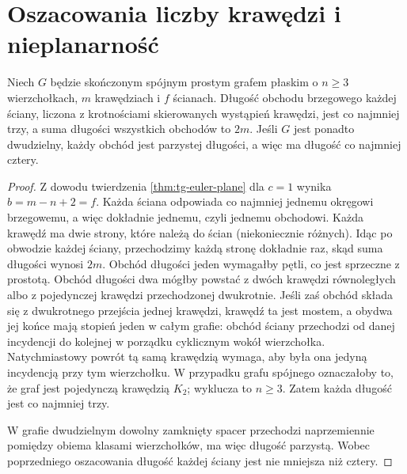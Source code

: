 \begin{center}
\end{center}

\section{Oszacowania liczby krawędzi i nieplanarność}
\label{sec:tg-planarne-granice}

\begin{lemat}
Niech $G$ będzie skończonym spójnym prostym grafem
płaskim o $n\geq3$ wierzchołkach, $m$ krawędziach
i $f$ ścianach.
Długość obchodu brzegowego każdej ściany, liczona
z krotnościami skierowanych wystąpień krawędzi, jest
co najmniej trzy, a suma długości wszystkich obchodów
to $2m$. Jeśli $G$ jest ponadto dwudzielny, każdy
obchód jest parzystej długości, a więc ma długość co najmniej cztery.
\end{lemat}

\begin{proof}
Z dowodu twierdzenia \ref{thm:tg-euler-plane}
dla $c=1$ wynika $b=m-n+2=f$. Każda ściana
odpowiada co najmniej jednemu okręgowi brzegowemu,
a więc dokładnie jednemu, czyli jednemu obchodowi.
Każda krawędź ma dwie strony, które należą do ścian
(niekoniecznie różnych). Idąc po obwodzie każdej ściany,
przechodzimy każdą stronę dokładnie raz, skąd suma długości
wynosi $2m$. Obchód długości jeden wymagałby pętli, co jest
sprzeczne z prostotą. Obchód długości dwa mógłby powstać
z dwóch krawędzi równoległych albo z pojedynczej krawędzi
przechodzonej dwukrotnie. Jeśli zaś obchód składa się z dwukrotnego przejścia
jednej krawędzi, krawędź ta jest mostem, a obydwa jej końce
mają stopień jeden w całym grafie: obchód ściany
przechodzi od danej incydencji do kolejnej w porządku
cyklicznym wokół wierzchołka. Natychmiastowy powrót
tą samą krawędzią wymaga, aby była ona jedyną
incydencją przy tym wierzchołku.
W przypadku grafu spójnego oznaczałoby to, że graf jest
pojedynczą krawędzią $K_2$; wyklucza to $n\ge3$.
Zatem każda długość jest co najmniej trzy.

W grafie dwudzielnym dowolny zamknięty spacer przechodzi
naprzemiennie pomiędzy obiema klasami wierzchołków,
ma więc długość parzystą. Wobec poprzedniego oszacowania
długość każdej ściany jest nie mniejsza niż cztery.
\end{proof}


